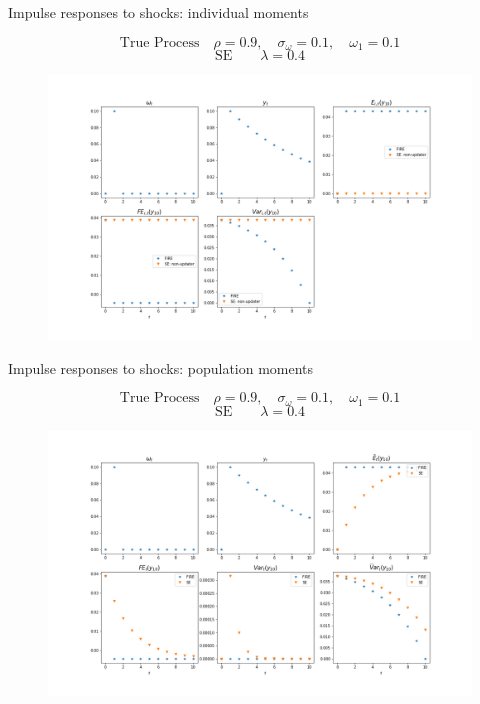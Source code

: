 \documentclass{beamer}
\begin{document}
\begin{frame}{Impulse responses to shocks: individual moments}

$$\textrm{True Process} \quad  \rho=0.9, \quad \sigma_\omega=0.1, \quad \omega_1 = 0.1$$
$$\textrm{SE} \quad \quad  \lambda = 0.4 $$ 
\begin{figure}
	\includegraphics[scale=0.25]{figures/ir_indse} 
\end{figure}
\end{frame}


\begin{frame}{Impulse responses to shocks: population moments}

$$\textrm{True Process} \quad  \rho=0.9, \quad \sigma_\omega=0.1, \quad \omega_1 = 0.1$$
$$\textrm{SE} \quad \quad  \lambda = 0.4 $$ 

\begin{figure}
	\includegraphics[scale=0.25]{figures/ir_popse} 
\end{figure}

\end{frame}
\end{document}
